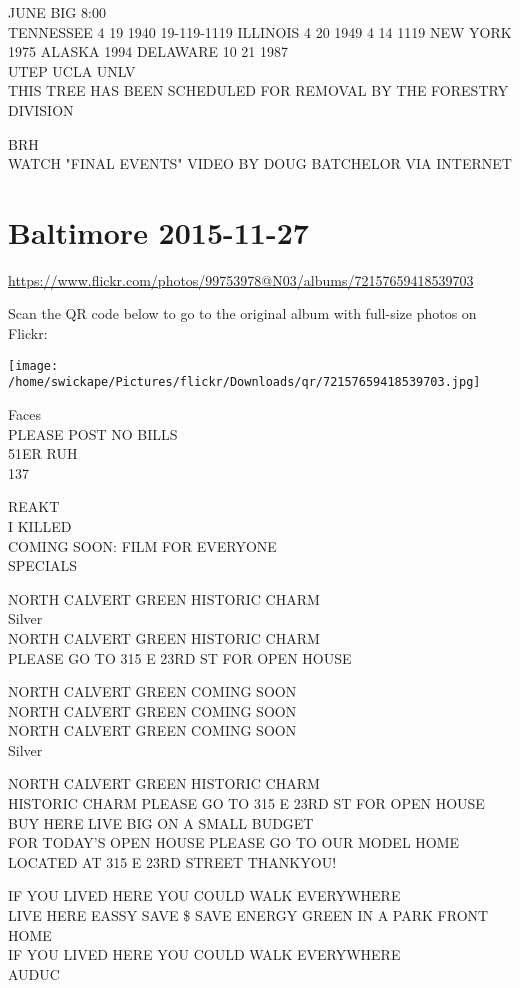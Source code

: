 \documentclass[10pt,letterpaper]{article}
\begin{document}
JUNE BIG 8:00\\
TENNESSEE 4 19 1940 19{-}119{-}1119 ILLINOIS 4 20 1949 4 14 1119 NEW YORK 1975 ALASKA 1994 DELAWARE 10 21 1987\\
UTEP UCLA UNLV\\
THIS TREE HAS BEEN SCHEDULED FOR REMOVAL BY THE FORESTRY DIVISION

BRH\\
WATCH "FINAL EVENTS" VIDEO BY DOUG BATCHELOR VIA INTERNET


\section*{Baltimore 2015-11-27}

\url{https://www.flickr.com/photos/99753978@N03/albums/72157659418539703}

Scan the QR code below to go to the original album with full-size photos on Flickr:

\texttt{[image: /home/swickape/Pictures/flickr/Downloads/qr/72157659418539703.jpg]}


Faces\\
PLEASE POST NO BILLS\\
51ER RUH\\
137

REAKT\\
I KILLED\\
COMING SOON: FILM FOR EVERYONE\\
SPECIALS

NORTH CALVERT GREEN HISTORIC CHARM\\
Silver\\
NORTH CALVERT GREEN HISTORIC CHARM\\
PLEASE GO TO 315 E 23RD ST FOR OPEN HOUSE

NORTH CALVERT GREEN COMING SOON\\
NORTH CALVERT GREEN COMING SOON\\
NORTH CALVERT GREEN COMING SOON\\
Silver

NORTH CALVERT GREEN HISTORIC CHARM\\
HISTORIC CHARM PLEASE GO TO 315 E 23RD ST FOR OPEN HOUSE\\
BUY HERE LIVE BIG ON A SMALL BUDGET\\
FOR TODAY'S OPEN HOUSE PLEASE GO TO OUR MODEL HOME LOCATED AT 315 E 23RD STREET THANKYOU!

IF YOU LIVED HERE YOU COULD WALK EVERYWHERE\\
LIVE HERE EASSY SAVE \$ SAVE ENERGY GREEN IN A PARK FRONT HOME\\
IF YOU LIVED HERE YOU COULD WALK EVERYWHERE\\
AUDUC
\end{document}
